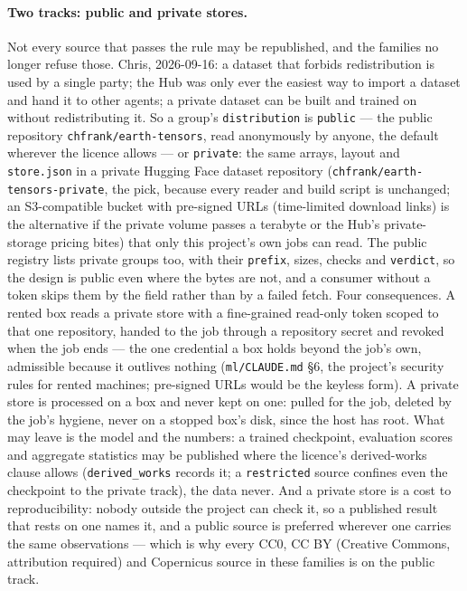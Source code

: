 \documentclass[10pt]{article}
\newcommand{\code}[1]{\texttt{#1}}
\begin{document}
\paragraph{Two tracks: public and private stores.} Not every source that
passes the rule may be republished, and the families no longer refuse
those. Chris, 2026-09-16: a dataset that forbids redistribution is used by a
single party; the Hub was only ever the easiest way to import a dataset and
hand it to other agents; a private dataset can be built and trained on
without redistributing it. So a group's \code{distribution} is \code{public}
--- the public repository \code{chfrank/\allowbreak earth-tensors}, read
anonymously by anyone, the default wherever the licence allows --- or
\code{private}: the same arrays, layout and \code{store.json} in a private
Hugging Face dataset repository (\code{chfrank/\allowbreak earth-tensors-private},
the pick, because every reader and build script is unchanged; an
S3-compatible bucket with pre-signed URLs (time-limited download links) is the alternative if the private
volume passes a terabyte or the Hub's private-storage pricing bites) that
only this project's own jobs can read. The public registry lists private
groups too, with their \code{prefix}, sizes, checks and \code{verdict}, so
the design is public even where the bytes are not, and a consumer without a
token skips them by the field rather than by a failed fetch. Four
consequences. A rented box reads a private store with a fine-grained
read-only token scoped to that one repository, handed to the job through a
repository secret and revoked when the job ends --- the one credential a box
holds beyond the job's own, admissible because it outlives nothing
(\code{ml/CLAUDE.md} \S6, the project's security rules for rented machines; pre-signed URLs would be the keyless form). A
private store is processed on a box and never kept on one: pulled for the
job, deleted by the job's hygiene, never on a stopped box's disk, since the
host has root. What may leave is the model and the numbers: a trained
checkpoint, evaluation scores and aggregate statistics may be published where
the licence's derived-works clause allows (\code{derived\_works} records it;
a \code{restricted} source confines even the checkpoint to the private
track), the data never. And a private store is a cost to reproducibility:
nobody outside the project can check it, so a published result that rests on
one names it, and a public source is preferred wherever one carries the same
observations --- which is why every CC0, CC BY (Creative Commons, attribution required) and Copernicus source in these
families is on the public track.
\end{document}
